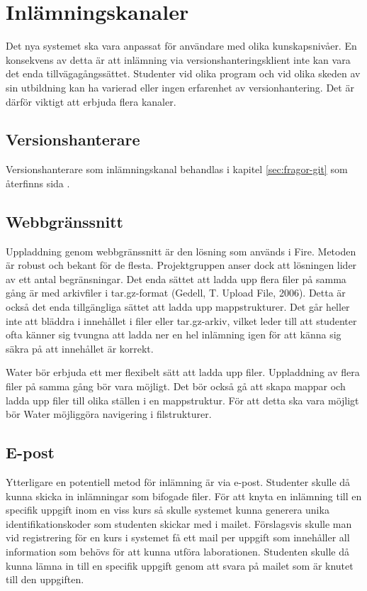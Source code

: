 \section{Inlämningskanaler}

Det nya systemet ska vara anpassat för användare med olika kunskapsnivåer. En konsekvens av detta är att inlämning via versionshanteringsklient inte kan vara det enda tillvägagångssättet. Studenter vid olika program och vid olika skeden av sin utbildning kan ha varierad eller ingen erfarenhet av versionhantering. Det är därför viktigt att erbjuda flera kanaler.

\subsection{Versionshanterare}
Versionshanterare som inlämningskanal behandlas i kapitel \ref{sec:fragor-git} som återfinns sida \pageref{sec:fragor-git}.

\subsection{Webbgränssnitt}
Uppladdning genom webbgränssnitt är den lösning som används i Fire. Metoden är robust och bekant för de flesta. Projektgruppen anser dock att lösningen lider av ett antal begränsningar. Det enda sättet att ladda upp flera filer på samma gång är med arkivfiler i tar.gz-format (Gedell, T. Upload File, 2006). Detta är också det enda tillgängliga sättet att ladda upp mappstrukturer. Det går heller inte att bläddra i innehållet i filer eller tar.gz-arkiv, vilket leder till att studenter ofta känner sig tvungna att ladda ner en hel inlämning igen för att känna sig säkra på att innehållet är korrekt.

Water bör erbjuda ett mer flexibelt sätt att ladda upp filer. Uppladdning av flera filer på samma gång bör vara möjligt. Det bör också gå att skapa mappar och ladda upp filer till olika ställen i en mappstruktur. För att detta ska vara möjligt bör Water möjliggöra navigering i filstrukturer.

\subsection{E-post}
Ytterligare en potentiell metod för inlämning är via e-post. Studenter skulle då kunna skicka in inlämningar som bifogade filer. För att knyta en inlämning till en specifik uppgift inom en viss kurs så skulle systemet kunna generera unika identifikationskoder som studenten skickar med i mailet. Förslagsvis skulle man vid registrering för en kurs i systemet få ett mail per uppgift som innehåller all information som behövs för att kunna utföra laborationen. Studenten skulle då kunna lämna in till en specifik uppgift genom att svara på mailet som är knutet till den uppgiften.

